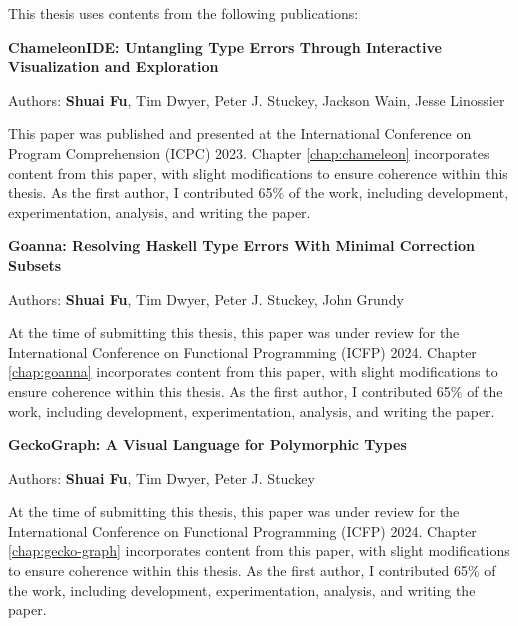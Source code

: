 \documentclass[
11pt, %
english, %
singlespacing, %
headsepline, %
]{MastersDoctoralThesis} %
\begin{document}
\begin{publications}

This thesis uses contents from the following publications:
\vspace{20px}

\noindent
\textbf{ChameleonIDE: Untangling Type Errors Through Interactive
  Visualization and Exploration}

\noindent
Authors: \textbf{Shuai Fu}, Tim Dwyer, Peter J. Stuckey, Jackson Wain, Jesse Linossier
\vspace{10px}

This paper was published and presented at the International Conference on Program Comprehension (ICPC) 2023. Chapter \ref{chap:chameleon} incorporates content from this paper, with slight modifications to ensure coherence within this thesis. As the first author, I contributed 65\% of the work, including development, experimentation, analysis, and writing the paper.
 

\vspace{30px}

\noindent
\textbf{Goanna: Resolving Haskell Type Errors With Minimal Correction Subsets}

\noindent
Authors: \textbf{Shuai Fu}, Tim Dwyer, Peter J. Stuckey, John Grundy
\vspace{10px}

At the time of submitting this thesis, this paper was under review for the International Conference on Functional Programming (ICFP) 2024. Chapter \ref{chap:goanna} incorporates content from this paper, with slight modifications to ensure coherence within this thesis. As the first author, I contributed 65\% of the work, including development, experimentation, analysis, and writing the paper.



\vspace{30px}


\noindent
\textbf{GeckoGraph: A Visual Language for Polymorphic Types}

\noindent
Authors: \textbf{Shuai Fu}, Tim Dwyer, Peter J. Stuckey
\vspace{10px}

At the time of submitting this thesis, this paper was under review for the International Conference on Functional Programming (ICFP) 2024. Chapter \ref{chap:gecko-graph} incorporates content from this paper, with slight modifications to ensure coherence within this thesis. As the first author, I contributed 65\% of the work, including development, experimentation, analysis, and writing the paper.

\end{publications}
\end{document}
